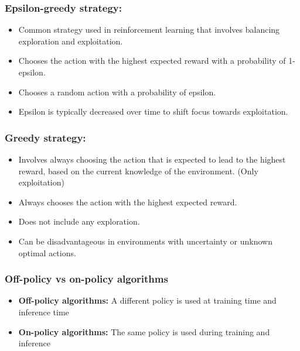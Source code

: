 \documentclass[11pt,a4paper]{article}
\begin{document}
\subsubsection{Epsilon-greedy strategy:}\label{epsilon-greedy-strategy}

\begin{itemize}
\tightlist
\item
  Common strategy used in reinforcement learning that involves balancing exploration and exploitation.
\item
  Chooses the action with the highest expected reward with a probability of 1-epsilon.
\item
  Chooses a random action with a probability of epsilon.
\item
  Epsilon is typically decreased over time to shift focus towards exploitation.
\end{itemize}

\subsubsection{Greedy strategy:}\label{greedy-strategy}

\begin{itemize}
\tightlist
\item
  Involves always choosing the action that is expected to lead to the highest reward, based on the current knowledge of the environment. (Only exploitation)
\item
  Always chooses the action with the highest expected reward.
\item
  Does not include any exploration.
\item
  Can be disadvantageous in environments with uncertainty or unknown optimal actions.
\end{itemize}

\subsubsection{Off-policy vs on-policy algorithms}\label{off-policy-vs-on-policy-algorithms}

\begin{itemize}
\tightlist
\item
  \textbf{Off-policy algorithms:} A different policy is used at training time and inference time
\item
  \textbf{On-policy algorithms:} The same policy is used during training and inference
\end{itemize}
\end{document}
